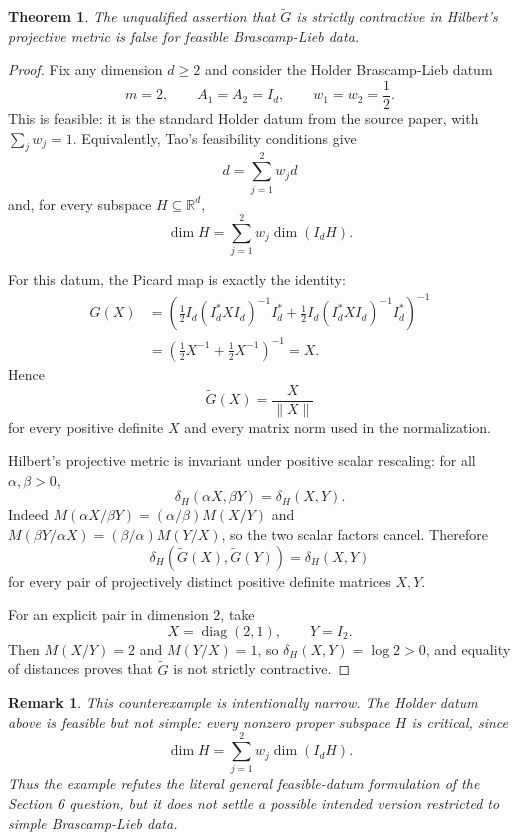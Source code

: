 \documentclass[11pt]{article}
\newtheorem{theorem}{Theorem}
\newtheorem{remark}{Remark}
\newcommand{\R}{\mathbb{R}}
\newcommand{\diag}{\operatorname{diag}}
\begin{document}
\begin{theorem}
The unqualified assertion that $\widetilde G$ is strictly contractive in
Hilbert's projective metric is false for feasible Brascamp-Lieb data.
\end{theorem}

\begin{proof}
Fix any dimension $d\ge 2$ and consider the Holder Brascamp-Lieb datum
\[
  m=2,\qquad A_1=A_2=I_d,\qquad w_1=w_2=\frac12.
\]
This is feasible: it is the standard Holder datum from the source paper, with
$\sum_j w_j=1$.  Equivalently, Tao's feasibility conditions give
\[
  d=\sum_{j=1}^2 w_j d
\]
and, for every subspace $H\subseteq \R^d$,
\[
  \dim H=\sum_{j=1}^2 w_j\dim(I_dH).
\]

For this datum, the Picard map is exactly the identity:
\[
\begin{aligned}
  G(X)
  &=\left(\frac12 I_d(I_d^\ast X I_d)^{-1}I_d^\ast
          +\frac12 I_d(I_d^\ast X I_d)^{-1}I_d^\ast\right)^{-1}  \\
  &=\left(\frac12 X^{-1}+\frac12 X^{-1}\right)^{-1}
   =X.
\end{aligned}
\]
Hence
\[
  \widetilde G(X)=\frac{X}{\|X\|}
\]
for every positive definite $X$ and every matrix norm used in the
normalization.

Hilbert's projective metric is invariant under positive scalar rescaling:
for all $\alpha,\beta>0$,
\[
  \delta_H(\alpha X,\beta Y)=\delta_H(X,Y).
\]
Indeed $M(\alpha X/\beta Y)=(\alpha/\beta)M(X/Y)$ and
$M(\beta Y/\alpha X)=(\beta/\alpha)M(Y/X)$, so the two scalar factors cancel.
Therefore
\[
  \delta_H(\widetilde G(X),\widetilde G(Y))
  =\delta_H(X,Y)
\]
for every pair of projectively distinct positive definite matrices $X,Y$.

For an explicit pair in dimension $2$, take
\[
  X=\diag(2,1),\qquad Y=I_2.
\]
Then $M(X/Y)=2$ and $M(Y/X)=1$, so $\delta_H(X,Y)=\log 2>0$, and equality of
distances proves that $\widetilde G$ is not strictly contractive.
\end{proof}

\begin{remark}
This counterexample is intentionally narrow.  The Holder datum above is
feasible but not simple: every nonzero proper subspace $H$ is critical, since
\[
  \dim H=\sum_{j=1}^2 w_j\dim(I_dH).
\]
Thus the example refutes the literal general feasible-datum formulation of the
Section 6 question, but it does not settle a possible intended version
restricted to simple Brascamp-Lieb data.
\end{remark}
\end{document}
